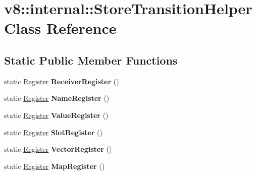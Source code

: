 \hypertarget{classv8_1_1internal_1_1_store_transition_helper}{}\section{v8\+:\+:internal\+:\+:Store\+Transition\+Helper Class Reference}
\label{classv8_1_1internal_1_1_store_transition_helper}
\subsection*{Static Public Member Functions}
\begin{DoxyCompactItemize}
\item 
static \hyperlink{structv8_1_1internal_1_1_register}{Register} {\bfseries Receiver\+Register} ()\hypertarget{classv8_1_1internal_1_1_store_transition_helper_a32830379dc256e7b66cc48b0a1ce221c}{}\label{classv8_1_1internal_1_1_store_transition_helper_a32830379dc256e7b66cc48b0a1ce221c}

\item 
static \hyperlink{structv8_1_1internal_1_1_register}{Register} {\bfseries Name\+Register} ()\hypertarget{classv8_1_1internal_1_1_store_transition_helper_a78c13e06429320d73dd9e87e39ac58fa}{}\label{classv8_1_1internal_1_1_store_transition_helper_a78c13e06429320d73dd9e87e39ac58fa}

\item 
static \hyperlink{structv8_1_1internal_1_1_register}{Register} {\bfseries Value\+Register} ()\hypertarget{classv8_1_1internal_1_1_store_transition_helper_a6d689d7d3d0a4d4244ec9ab298a856fd}{}\label{classv8_1_1internal_1_1_store_transition_helper_a6d689d7d3d0a4d4244ec9ab298a856fd}

\item 
static \hyperlink{structv8_1_1internal_1_1_register}{Register} {\bfseries Slot\+Register} ()\hypertarget{classv8_1_1internal_1_1_store_transition_helper_ab3fd819fba9969c3bb5e3e97fcf5d327}{}\label{classv8_1_1internal_1_1_store_transition_helper_ab3fd819fba9969c3bb5e3e97fcf5d327}

\item 
static \hyperlink{structv8_1_1internal_1_1_register}{Register} {\bfseries Vector\+Register} ()\hypertarget{classv8_1_1internal_1_1_store_transition_helper_ae8b3cafbaee4937434028aafee78a15a}{}\label{classv8_1_1internal_1_1_store_transition_helper_ae8b3cafbaee4937434028aafee78a15a}

\item 
static \hyperlink{structv8_1_1internal_1_1_register}{Register} {\bfseries Map\+Register} ()\hypertarget{classv8_1_1internal_1_1_store_transition_helper_ae62ba0bea0c15b3a6aeeac8f9b2521ab}{}\label{classv8_1_1internal_1_1_store_transition_helper_ae62ba0bea0c15b3a6aeeac8f9b2521ab}


\end{DoxyCompactItemize}
